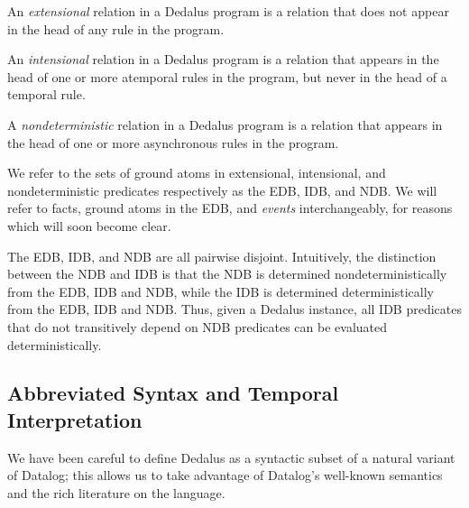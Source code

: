 \begin{definition}
%
An \emph{extensional} relation in a Dedalus program is a relation that does not
appear in the head of any rule in the program.
%
\end{definition}

 \begin{definition}
 An \emph{intensional} relation in a Dedalus program is a relation that appears
 in the head of one or more atemporal rules in the program, but never in the head of a temporal rule.
 \end{definition}

 \begin{definition}
 A \emph{nondeterministic} relation in a Dedalus program is a relation that appears in
 the head of one or more asynchronous rules in the program.
 \end{definition}

 We refer to the sets of ground atoms in extensional, intensional, and nondeterministic
 predicates respectively as the EDB, IDB, and NDB.  We will refer to facts, ground atoms
 in the EDB, and \emph{events} interchangeably, for reasons which will soon become clear.

 The EDB, IDB, and NDB are all pairwise disjoint.  Intuitively, the distinction
 between the NDB and IDB is that the NDB is determined nondeterministically from
 the EDB, IDB and NDB, while the IDB is determined deterministically from the
 EDB, IDB and NDB.  Thus, given a Dedalus instance, all IDB
 predicates that do not transitively depend on NDB predicates can be evaluated
 deterministically.  





\subsection{Abbreviated Syntax and Temporal Interpretation}
We have been careful to define Dedalus as a syntactic subset of a natural variant of Datalog; this allows us to take advantage of Datalog's well-known semantics and the rich literature on the language.  

